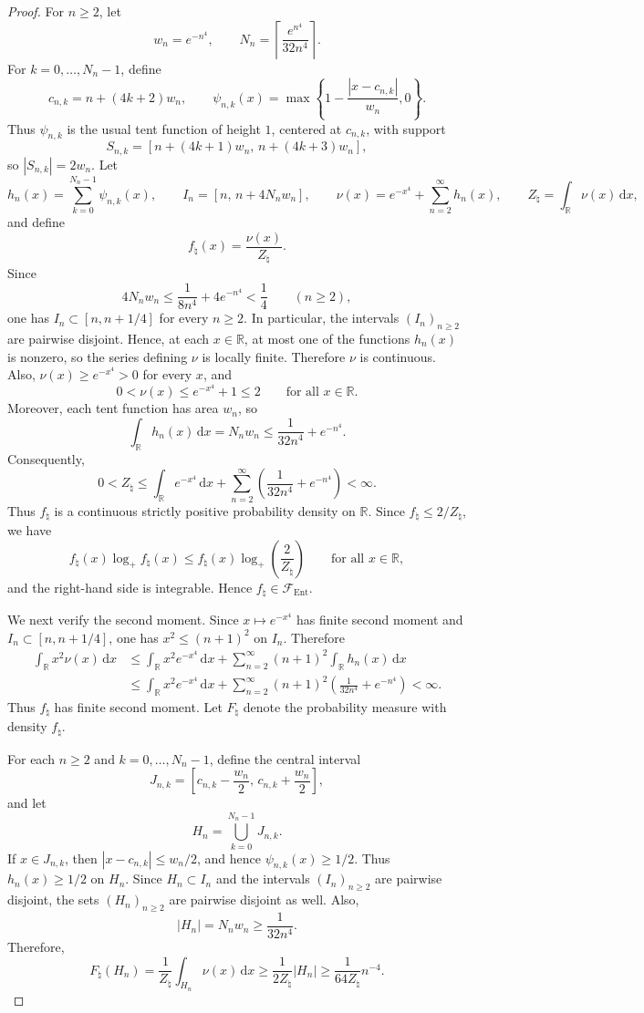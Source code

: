 \documentclass[11pt]{article}
\theoremstyle{definition}
\begin{document}
\begin{proof}
For $n\ge2$, let
\[
w_n=e^{-n^4},
\qquad
N_n=\left\lceil \frac{e^{n^4}}{32n^4}\right\rceil.
\]
For $k=0,\dots,N_n-1$, define
\[
c_{n,k}=n+(4k+2)w_n,
\qquad
\psi_{n,k}(x)=\max\!\left\{1-\frac{|x-c_{n,k}|}{w_n},0\right\}.
\]
Thus $\psi_{n,k}$ is the usual tent function of height $1$, centered at $c_{n,k}$, with support
\[
S_{n,k}=\left[n+(4k+1)w_n,\,n+(4k+3)w_n\right],
\]
so $|S_{n,k}|=2w_n$. Let
\[
h_n(x)=\sum_{k=0}^{N_n-1}\psi_{n,k}(x),
\qquad
I_n=[n,\,n+4N_nw_n],
\qquad
\nu(x)=e^{-x^4}+\sum_{n=2}^{\infty} h_n(x),
\qquad
Z_\natural=\int_{\mathbb{R}} \nu(x)\,\mathrm{d}x,
\]
and define
\[
f_\natural(x)=\frac{\nu(x)}{Z_\natural}.
\]
Since
\[
4N_nw_n\le \frac{1}{8n^4}+4e^{-n^4}<\frac14
\qquad (n\ge2),
\]
one has $I_n\subset [n,n+1/4]$ for every $n\ge2$. In particular, the intervals $(I_n)_{n\ge2}$ are pairwise disjoint. Hence, at each $x\in\mathbb{R}$, at most one of the functions $h_n(x)$ is nonzero, so the series defining $\nu$ is locally finite. Therefore $\nu$ is continuous. Also, $\nu(x)\ge e^{-x^4}>0$ for every $x$, and
\[
0<\nu(x)\le e^{-x^4}+1\le 2
\qquad \text{for all }x\in\mathbb{R}.
\]
Moreover, each tent function has area $w_n$, so
\[
\int_{\mathbb{R}} h_n(x)\,\mathrm{d}x=N_nw_n\le \frac{1}{32n^4}+e^{-n^4}.
\]
Consequently,
\[
0<Z_\natural\le \int_{\mathbb{R}} e^{-x^4}\,\mathrm{d}x+\sum_{n=2}^{\infty}\left(\frac{1}{32n^4}+e^{-n^4}\right)<\infty.
\]
Thus $f_\natural$ is a continuous strictly positive probability density on $\mathbb{R}$. Since $f_\natural\le 2/Z_\natural$, we have
\[
f_\natural(x)\log_+ f_\natural(x)
\le f_\natural(x)\log_+\!\left(\frac{2}{Z_\natural}\right)
\qquad \text{for all }x\in\mathbb{R},
\]
and the right-hand side is integrable. Hence $f_\natural\in\mathcal F_{\mathrm{Ent}}$.

We next verify the second moment. Since $x\mapsto e^{-x^4}$ has finite second moment and $I_n\subset[n,n+1/4]$, one has $x^2\le (n+1)^2$ on $I_n$. Therefore
\begin{align*}
\int_{\mathbb{R}} x^2\nu(x)\,\mathrm{d}x
&\le \int_{\mathbb{R}} x^2 e^{-x^4}\,\mathrm{d}x
+\sum_{n=2}^{\infty}(n+1)^2\int_{\mathbb{R}} h_n(x)\,\mathrm{d}x\\
&\le \int_{\mathbb{R}} x^2 e^{-x^4}\,\mathrm{d}x
+\sum_{n=2}^{\infty}(n+1)^2\left(\frac{1}{32n^4}+e^{-n^4}\right)<\infty.
\end{align*}
Thus $f_\natural$ has finite second moment. Let $F_\natural$ denote the probability measure with density $f_\natural$.

For each $n\ge2$ and $k=0,\dots,N_n-1$, define the central interval
\[
J_{n,k}=\left[c_{n,k}-\frac{w_n}{2},\,c_{n,k}+\frac{w_n}{2}\right],
\]
and let
\[
H_n=\bigcup_{k=0}^{N_n-1} J_{n,k}.
\]
If $x\in J_{n,k}$, then $|x-c_{n,k}|\le w_n/2$, and hence $\psi_{n,k}(x)\ge 1/2$. Thus $h_n(x)\ge1/2$ on $H_n$. Since $H_n\subset I_n$ and the intervals $(I_n)_{n\ge2}$ are pairwise disjoint, the sets $(H_n)_{n\ge2}$ are pairwise disjoint as well. Also,
\[
|H_n|=N_nw_n\ge \frac{1}{32n^4}.
\]
Therefore,
\[
F_\natural(H_n)=\frac{1}{Z_\natural}\int_{H_n}\nu(x)\,\mathrm{d}x
\ge \frac{1}{2Z_\natural}|H_n|
\ge \frac{1}{64Z_\natural}n^{-4}.
\]


\end{proof}
\end{document}
